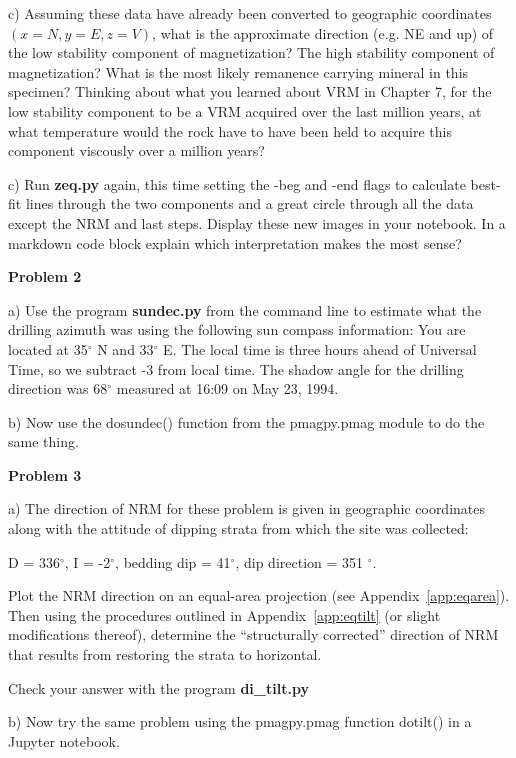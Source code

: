 {c)     Assuming these data have already been converted to geographic coordinates $(x=N,y=E,z=V)$, what is the approximate direction (e.g. NE and up) of the low stability component
of magnetization? The high stability component of magnetization? What is
the most likely remanence carrying mineral in this specimen?   Thinking about what you learned about VRM in Chapter 7, for the low stability component to be a VRM acquired over the last million years,  at what temperature would the rock have to have been held to acquire this component viscously over a million years?  


c) Run  {\bf zeq.py} again, this time setting the -beg and -end flags to calculate best-fit lines through the two components and a great circle through all the data except the NRM and last steps.  Display these new images in your notebook.  In a markdown code block explain which interpretation makes the most sense?  



{\bf Problem 2 }

a) Use the program {\bf sundec.py}  from the command line to estimate what the drilling azimuth was using the following sun compass information:   You are located at 35$^{\circ}$ N and 33$^{\circ}$ E.  The local
time is three hours ahead of Universal Time, so we subtract -3 from local time.  The shadow angle for the
drilling direction was 68$^{\circ}$ measured at 16:09 on May 23, 1994.

b) Now use the dosundec() function from the pmagpy.pmag  module to do the same thing.  

{\bf Problem 3}

a) The direction of NRM  for these problem is given in geographic coordinates along with the
attitude of dipping strata from which the site was collected:    

D = 336$^{\circ}$, I = -2$^{\circ}$, bedding dip = 41$^{\circ}$, dip direction = 351 $^{\circ}$.  

Plot the NRM direction on an equal-area
projection (see Appendix~\ref{app:eqarea}).   Then using the procedures outlined in Appendix~\ref{app:eqtilt} (or slight modifications thereof), determine
the ``structurally corrected'' direction of NRM that results from restoring the strata to horizontal.

Check your answer with the program {\bf di\_tilt.py}

b) Now try the same problem using the pmagpy.pmag function dotilt() in a Jupyter notebook.   



}
